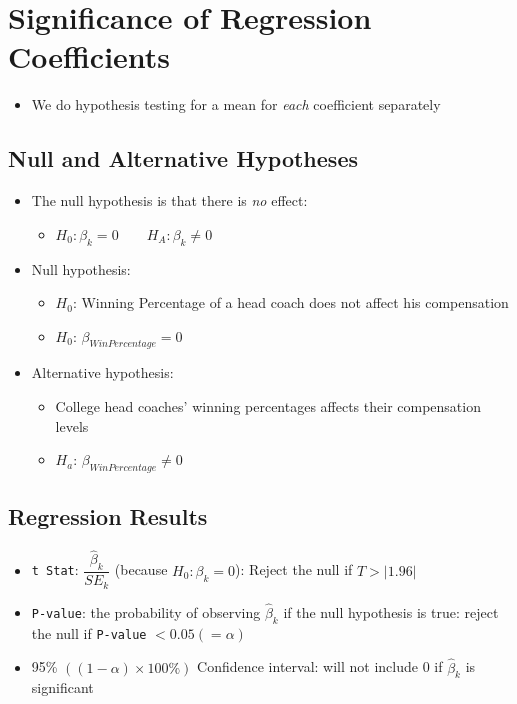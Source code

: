\documentclass[10pt,article]{article}
\begin{document}
\section{Significance of Regression Coefficients}
\label{sec:orgeb3d3e9}
\begin{itemize}
\item We do hypothesis testing for a mean for \emph{each} coefficient separately
\end{itemize}
\subsection{Null and Alternative Hypotheses}
\label{sec:orgb61faeb}
\begin{itemize}
\item The null hypothesis is that there is \emph{no} effect:
\begin{itemize}
\item \(H_{0}: \beta_{k}=0 \qquad H_{A}: \beta_k \ne 0\)
\end{itemize}
\end{itemize}

\begin{itemize}
\item Null hypothesis:
\begin{itemize}
\item \(H_0\): Winning Percentage of a head coach does not affect his
compensation
\item \(H_0\): \(\beta_{WinPercentage} = 0\)
\end{itemize}

\item Alternative hypothesis: 
\begin{itemize}
\item College head coaches' winning percentages affects their compensation levels
\item \(H_{a}\): \(\beta_{WinPercentage} \ne 0\)
\end{itemize}
\end{itemize}

\subsection{Regression Results}
\label{sec:org68add66}
\begin{itemize}
\item \texttt{t Stat}: \(\dfrac{\hat{\beta}_{k}}{SE_{k}}\) (because \(H_0: \beta_k=0\)): Reject the null if \(T > |1.96|\)
\end{itemize}

\begin{itemize}
\item \texttt{P-value}: the probability of observing \(\hat{\beta}_{k}\) if the null
hypothesis is true: reject the null if \texttt{P-value} \(< 0.05 (=\alpha)\)
\end{itemize}

\begin{itemize}
\item 95\% \(((1-\alpha) \times 100 \%)\) Confidence interval: will not include
0 if \(\hat{\beta}_{k}\) is significant
\end{itemize}
\end{document}
